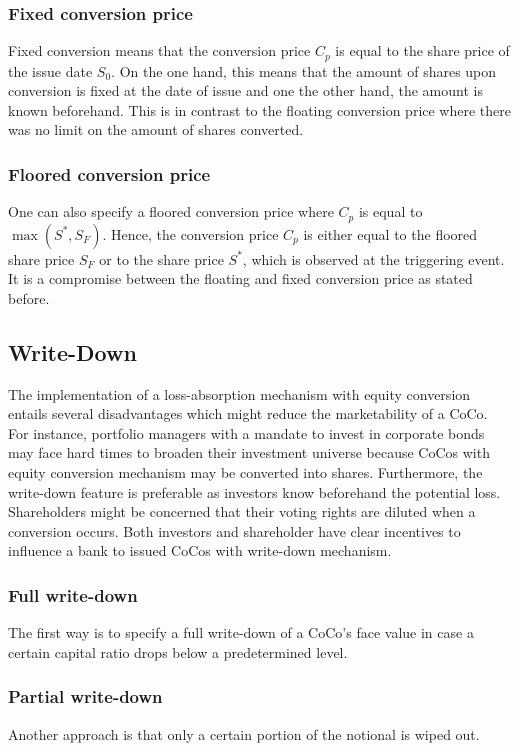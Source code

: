 \subsubsection*{Fixed conversion price}
Fixed conversion means that the conversion price $C_p$ is equal to the share price of the issue date $S_0$. On the one hand, this means that the amount of shares upon conversion is fixed at the date of issue and one the other hand, the amount is known beforehand. This is in contrast to the floating conversion price where there was no limit on the amount of shares converted.\citep{de2014handbook}

\subsubsection*{Floored conversion price}
One can also specify a floored conversion price where $C_p$ is equal to $\max\left( S^*, S_F \right)$. Hence, the conversion price $C_p$ is either equal to the floored share price $S_F$ or to the share price $S^*$, which is observed at the triggering event. It is a compromise between the floating and fixed conversion price as stated before. \citep{de2014handbook}

\subsection{Write-Down}

The implementation of a loss-absorption mechanism with equity conversion entails several disadvantages which might reduce the marketability of a CoCo. For instance, portfolio managers with a mandate to invest in corporate bonds may face hard times to broaden their investment universe because CoCos with equity conversion mechanism may be converted into shares. Furthermore, the write-down feature is preferable as investors know beforehand the potential loss. Shareholders might be concerned that their voting rights are diluted when a conversion occurs. Both investors and shareholder have clear incentives to influence a bank to issued CoCos with write-down mechanism.  

\subsubsection*{Full write-down}
The first way is to specify a full write-down of a CoCo's face value in case a certain capital ratio drops below a predetermined level.

\subsubsection*{Partial write-down}
Another approach is that only a certain portion of the notional is wiped out. 

